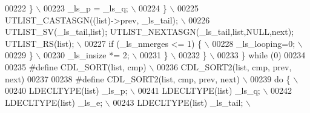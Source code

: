 \begin{DoxyCode}
00222 \textcolor{preprocessor}{        \}                                                                                      \(\backslash\)}
00223 \textcolor{preprocessor}{        \_ls\_p = \_ls\_q;                                                                         \(\backslash\)}
00224 \textcolor{preprocessor}{      \}                                                                                        \(\backslash\)}
00225 \textcolor{preprocessor}{      UTLIST\_CASTASGN((list)->prev, \_ls\_tail);                                                 \(\backslash\)}
00226 \textcolor{preprocessor}{      UTLIST\_SV(\_ls\_tail,list); UTLIST\_NEXTASGN(\_ls\_tail,list,NULL,next); UTLIST\_RS(list);     \(\backslash\)}
00227 \textcolor{preprocessor}{      if (\_ls\_nmerges <= 1) \{                                                                  \(\backslash\)}
00228 \textcolor{preprocessor}{        \_ls\_looping=0;                                                                         \(\backslash\)}
00229 \textcolor{preprocessor}{      \}                                                                                        \(\backslash\)}
00230 \textcolor{preprocessor}{      \_ls\_insize *= 2;                                                                         \(\backslash\)}
00231 \textcolor{preprocessor}{    \}                                                                                          \(\backslash\)}
00232 \textcolor{preprocessor}{  \}                                                                                            \(\backslash\)}
00233 \textcolor{preprocessor}{\} while (0)}
00234 
00235 \textcolor{preprocessor}{#define CDL\_SORT(list, cmp)                                                                    \(\backslash\)}
00236 \textcolor{preprocessor}{    CDL\_SORT2(list, cmp, prev, next)}
00237 
00238 \textcolor{preprocessor}{#define CDL\_SORT2(list, cmp, prev, next)                                                       \(\backslash\)}
00239 \textcolor{preprocessor}{do \{                                                                                           \(\backslash\)}
00240 \textcolor{preprocessor}{  LDECLTYPE(list) \_ls\_p;                                                                       \(\backslash\)}
00241 \textcolor{preprocessor}{  LDECLTYPE(list) \_ls\_q;                                                                       \(\backslash\)}
00242 \textcolor{preprocessor}{  LDECLTYPE(list) \_ls\_e;                                                                       \(\backslash\)}
00243 \textcolor{preprocessor}{  LDECLTYPE(list) \_ls\_tail;                                                                    \(\backslash\)}

\end{DoxyCode}
